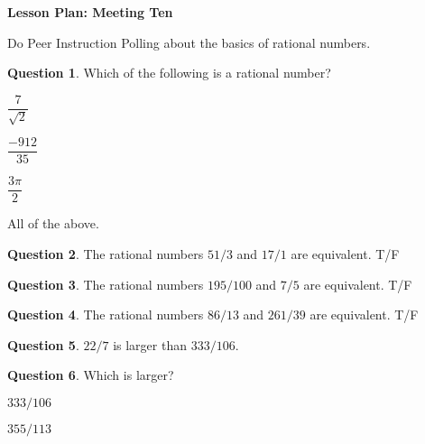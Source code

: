 \documentclass[12pt]{amsart}
\theoremstyle{definition}
\newtheorem{question}{Question}
\begin{document}
\begin{center}
\textbf{\Huge
Lesson Plan: Meeting Ten
}
\end{center}
\vspace{.5in}

Do Peer Instruction Polling about the basics of rational numbers.

\begin{question}
Which of the following is a rational number?
\begin{compactitem}
\item $\dfrac{7}{\sqrt{2}}$
\item $\dfrac{-912}{35}$
\item $\dfrac{3\pi}{2}$
\item All of the above.
\end{compactitem}
\end{question}

\begin{question}
The rational numbers $51/3$ and $17/1$ are equivalent. T/F
\end{question}

\begin{question}
The rational numbers $195/100$ and $7/5$ are equivalent. T/F
\end{question}

\begin{question}
The rational numbers $86/13$ and $261/39$ are equivalent. T/F
\end{question}

\begin{question}
$22/7$ is larger than $333/106$.
\end{question}

\begin{question}
Which is larger?
\begin{compactitem}
\item $333/106$
\item $355/113$
\end{compactitem}
\end{question}
\end{document}
